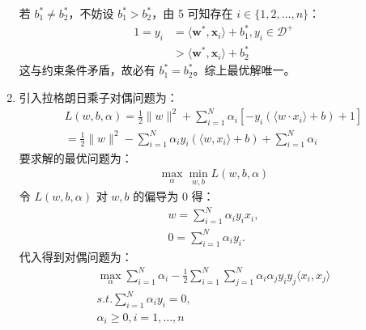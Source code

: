 \documentclass[11pt,letter,notitlepage]{article}
\begin{document}
\begin{solution}
\begin{enumerate}
		若 $b_1^* \neq b_2^*$，不妨设 $b_1^* > b_2^*$，由 5 可知存在 $i \in \{1, 2,\dots, n\}$：
		\begin{align*}
			1=y_i &= \langle \textbf{w}^*, \textbf{x}_i \rangle + b_1^*, y_i \in \mathcal{D}^+\\
			&> \langle \textbf{w}^*, \textbf{x}_i \rangle + b_2^*
		\end{align*}
		这与约束条件矛盾，故必有 $b_1^* = b_2^*$。综上最优解唯一。
		\item 引入拉格朗日乘子对偶问题为：
		\begin{align*}
			{ L ( w , b , \alpha ) = \frac { 1 } { 2 } \| w \| ^ { 2 } + \sum _ { i = 1 } ^ { N } \alpha _ { i } \left[ - y _ { i } \left( \langle w \cdot x _ { i } \rangle + b \right) + 1 \right] } \\ { = \frac { 1 } { 2 } \| w \| ^ { 2 } - \sum _ { i = 1 } ^ { N } \alpha _ { i } y _ { i } \left(\langle w, x_i\rangle + b \right) + \sum _ { i = 1 } ^ { N } \alpha _ { i } }
		\end{align*}
		要求解的最优问题为：
		\begin{align*}
			\max_{\alpha} \min_{w, b} L ( w , b , \alpha )
		\end{align*}
		令 $L(w, b, \alpha)$ 对 $w, b$ 的偏导为 0 得：
		\begin{align*}
			w = \sum\limits_{i=1}^{N}\alpha_iy_ix_i,\\
			0 = \sum\limits_{i=1}^{N}\alpha_iy_i.
		\end{align*} 
		代入得到对偶问题为：
		\begin{align*}
			\max_{\alpha} \sum\limits_{i=1}^{N} \alpha_i - \frac{1}{2}\sum\limits_{i=1}^{N}\sum\limits_{j=1}^{N}\alpha_i\alpha_jy_iy_j\langle x_i, x_j \rangle\\
			s.t. \sum\limits_{i=1}^{N}\alpha_iy_i = 0,\\
			\alpha_i \geqslant 0, i= 1,\ldots,n
		\end{align*}
	\end{enumerate}
\end{solution}
\end{document}
